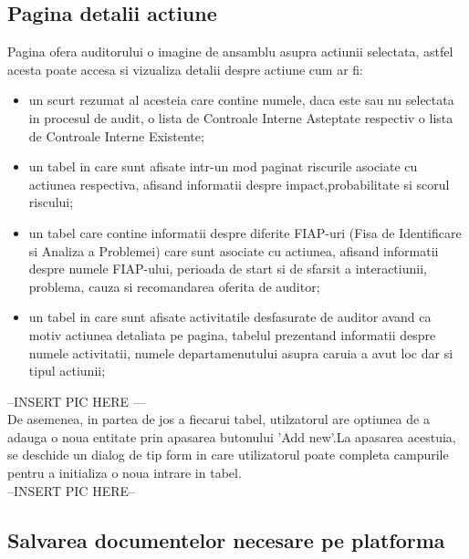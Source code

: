 \subsection{Pagina detalii actiune}
Pagina ofera auditorului o imagine de ansamblu asupra actiunii selectata, astfel acesta poate accesa si vizualiza detalii despre actiune cum ar fi:\\
\begin{itemize}
	\item un scurt rezumat al acesteia care contine numele, daca este sau nu selectata in procesul de audit, o lista de Controale Interne Asteptate respectiv o lista de Controale Interne Existente;
	
	\item  un tabel in care sunt afisate intr-un mod paginat riscurile asociate cu actiunea respectiva, afisand informatii despre impact,probabilitate si scorul riscului;
	
	\item  un tabel care contine informatii despre diferite FIAP-uri (Fisa de Identificare si Analiza a Problemei) care sunt asociate cu actiunea, afisand informatii despre numele FIAP-ului, perioada de start si de sfarsit a interactiunii, problema, cauza si recomandarea oferita de auditor;
	
	\item  un tabel  in care sunt afisate activitatile desfasurate de auditor avand ca motiv actiunea detaliata pe pagina, tabelul prezentand informatii despre numele activitatii, numele departamenutului asupra caruia a avut loc dar si tipul actiunii;
	
\end{itemize}

--INSERT PIC HERE ---\\
De asemenea, in partea de jos a fiecarui tabel, utilzatorul are optiunea de a adauga o noua entitate prin apasarea butonului 'Add new'.La apasarea acestuia, se deschide un dialog de tip 
form in care utilizatorul poate completa campurile pentru a initializa o noua intrare in tabel.\\

--INSERT PIC HERE--\\

\subsection{Salvarea documentelor necesare pe platforma}

